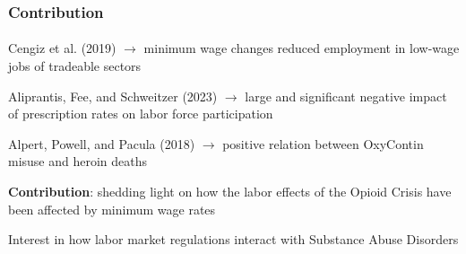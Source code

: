 \begin{frame}

    \frametitle{Contribution} %
    \framesubtitle{}  %
    \rmfamily %

    \begin{wideitemize}
        \item \textcolor{fgre}{Cengiz et al. (2019)} \(\to\) minimum wage changes reduced employment in low-wage jobs of tradeable sectors
        \item \textcolor{fgre}{Aliprantis, Fee, and Schweitzer (2023)} \(\to\) large and significant negative impact of prescription rates on labor force participation
        \item \textcolor{fgre}{Alpert, Powell, and Pacula (2018)} \(\to\) positive relation between OxyContin misuse and heroin deaths 
    \end{wideitemize}

    \vspace{9pt}
    \textbf{Contribution}: shedding light on how the labor effects of the \textcolor{fblu}{Opioid Crisis} have been affected by \textcolor{fblu}{minimum wage rates}
    \vspace{9pt}
    
    \begin{wideitemize}
        \item Interest in how \textcolor{fblu}{labor market regulations} interact with \textcolor{fblu}{Substance Abuse Disorders}
    \end{wideitemize}
    
\end{frame}

